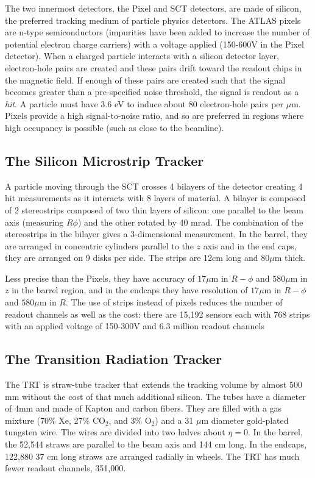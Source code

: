 The two innermost detectors, the Pixel and \ac{SCT} detectors, are made of silicon, the preferred tracking medium of particle physics detectors. The \ac{ATLAS} pixels are n-type semiconductors (impurities have been added to increase the number of potential electron charge carriers) with a voltage applied (150-600V in the Pixel detector).  When a charged particle interacts with a silicon detector layer, electron-hole pairs are created and these pairs drift toward the readout chips in the magnetic field. If enough of these pairs are created such that the signal becomes greater than a pre-specified noise threshold, the signal is readout as a \emph{hit}. A particle must have 3.6 eV to induce about 80 electron-hole pairs per $\mu$m. Pixels provide a high signal-to-noise ratio, and so are preferred in regions where high occupancy is possible (such as close to the beamline). \cite{silicon} 

\subsection{The Silicon Microstrip Tracker}
A particle moving through the \ac{SCT} crosses 4 bilayers of the detector creating 4 hit measurements as it interacts with 8 layers of material. A  bilayer is composed of 2 stereostrips composed of two thin layers of silicon: one parallel to the beam axis (measuring $R\phi$) and the other rotated by 40 mrad. The combination of the stereostrips in the bilayer gives a 3-dimensional measurement. In the barrel, they are arranged in concentric cylinders parallel to the $z$ axis and in the end caps, they are arranged on 9 disks per side. The strips are 12cm long and $80 \mu\textrm{m}$ thick.

Less precise than the Pixels, they have accuracy of $17 \mu \textrm{m}$ in $R-\phi$ and $580 \mu \textrm{m}$ in $z$ in the barrel region, and in the endcaps they have resolution of $17 \mu \textrm{m}$ in $R-\phi$ and $580 \mu \textrm{m}$ in $R$. The use of strips instead of pixels reduces the number of readout channels as well as the cost: there are 15,192 sensors each with 768 strips with an applied voltage of 150-300V and 6.3 million readout channels 
 

\subsection{The Transition Radiation Tracker}
The \ac{TRT} is straw-tube tracker that extends the tracking volume by almost 500 mm without the cost of that much additional silicon. The tubes have a diameter of 4mm and made of Kapton and carbon fibers. They are filled with a gas mixture (70\% Xe, 27\% CO$_{2}$, and 3\% O$_{2}$) and a 31 $\mu$m diameter gold-plated tungsten wire. The wires are divided into two halves about $\eta = 0$. In the barrel, the 52,544 straws are parallel to the beam axis and 144 cm long. In the endcaps, 122,880 37 cm long straws are arranged radially in wheels. The \ac{TRT} has much fewer readout channels, 351,000.

